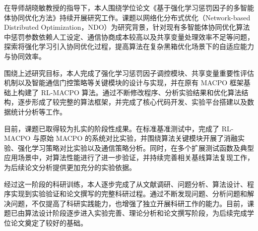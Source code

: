 \begin{titlepage}
\par
\indent
在导师胡晓敏教授的指导下，本人围绕学位论文《基于强化学习惩罚因子的多智能体协同优化方法》持续开展研究工作。课题以网络化分布式优化（Network-based Distributed Optimization，NDO）为研究背景，针对现有多智能体协同优化算法中惩罚参数依赖人工设定、通信协商成本较高以及共享变量处理效率不足等问题，探索将强化学习引入协同优化过程，提高算法在复杂黑箱优化场景下的自适应能力与协同效率。

\par
\indent
围绕上述研究目标，本人完成了强化学习惩罚因子调控模块、共享变量重要性评估机制以及智能通信门控策略等关键模块的设计与实现，并在原有 MACPO 框架基础上构建了 RL-MACPO 算法。通过不断修改程序、分析实验结果和优化算法结构，逐步形成了较完整的算法框架，并完成了核心代码开发、实验平台搭建以及数据统计分析等工作。

\par
\indent
目前，课题已取得较为扎实的阶段性成果。在标准基准测试中，完成了 RL-MACPO 与原始 MACPO 的系统对比实验，并围绕算法关键模块开展了消融实验、强化学习策略对比实验以及通信策略分析。同时，在多个扩展测试函数及典型应用场景中，对算法性能进行了进一步验证，并持续完善相关基线算法复现工作，为后续论文分析提供更加充分的实验依据。

\par
\indent
经过这一阶段的科研训练，本人逐步完成了从文献调研、问题分析、算法设计、程序实现到实验验证和论文撰写的完整科研过程。通过不断发现问题、分析问题和解决问题，不仅提高了科研实践能力，也增强了独立开展科研工作的能力。目前，课题已由算法设计阶段逐步进入实验完善、理论分析和论文撰写阶段，为后续完成学位论文奠定了较好的基础。

\end{titlepage}

